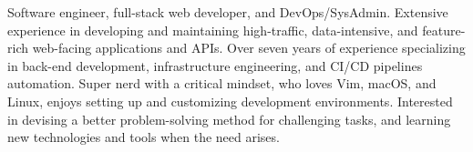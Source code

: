 

\begin{cvparagraph}
Software engineer, full-stack web developer, and DevOps/SysAdmin. Extensive experience in developing and maintaining high-traffic, data-intensive, and feature-rich web-facing applications and APIs.
Over seven years of experience specializing in back-end development, infrastructure engineering, and CI/CD pipelines automation.
Super nerd with a critical mindset, who loves Vim, macOS, and Linux, enjoys setting up and customizing development environments.
Interested in devising a better problem-solving method for challenging tasks, and learning new technologies and tools when the need arises.
\end{cvparagraph}
